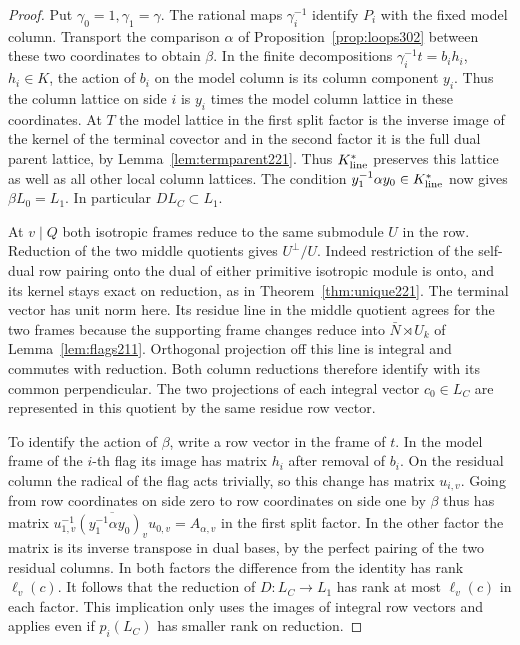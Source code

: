 \documentclass[a4paper,11pt]{article}
\theoremstyle{definition}
\theoremstyle{remark}
\numberwithin{equation}{section}
\begin{document}
\begin{proof}
Put \(\gamma_0=1,\gamma_1=\gamma\). The rational maps
\(\gamma_i^{-1}\) identify \(P_i\) with the fixed model
column. Transport the comparison \(\alpha\) of
Proposition~\ref{prop:loops302} between these two coordinates
to obtain \(\beta\). In the finite decompositions
\(\gamma_i^{-1}t=b_i h_i\), \(h_i\in K\), the action of
\(b_i\) on the model column is its column component \(y_i\).
Thus the column lattice on side \(i\) is \(y_i\) times the
model column lattice in these coordinates. At \(T\) the
model lattice in the first split factor is the inverse
image of the kernel of the terminal covector and in the
second factor it is the full dual parent lattice, by
Lemma~\ref{lem:termparent221}. Thus \(K_{\rm line}^*\)
preserves this lattice as well as all other local column
lattices. The condition \(y_1^{-1}\alpha y_0\in K_{\rm line}^*\)
now gives \(\beta L_0=L_1\). In particular \(D L_C\subset L_1\).

At \(v\mid Q\) both isotropic frames reduce to the same
submodule \(U\) in the row. Reduction of the two middle
quotients gives \(U^\perp/U\). Indeed restriction of the
self-dual row pairing onto the dual of either primitive
isotropic module is onto, and its kernel stays exact on
reduction, as in Theorem~\ref{thm:unique221}. The terminal
vector has unit norm here. Its residue line in the middle
quotient agrees for the two frames because the supporting
frame changes reduce into \(\bar N\rtimes U_k\) of
Lemma~\ref{lem:flags211}. Orthogonal projection off this
line is integral and commutes with reduction. Both column
reductions therefore identify with its common perpendicular.
The two projections of each integral vector \(c_0\in L_C\)
are represented in this quotient by the same residue
row vector.

To identify the action of \(\beta\), write a row vector in
the frame of \(t\). In the model frame of the \(i\)-th flag its
image has matrix \(h_i\) after removal of \(b_i\). On the
residual column the radical of the flag acts trivially, so
this change has matrix \(u_{i,v}\). Going from row coordinates
on side zero to row coordinates on side one by \(\beta\)
thus has matrix
\(u_{1,v}^{-1}\overline{(y_1^{-1}\alpha y_0)_v}u_{0,v}
=A_{\alpha,v}\) in the first split factor. In the other
factor the matrix is its inverse transpose in dual bases,
by the perfect pairing of the two residual columns. In both
factors the difference from the identity has rank \(\ell_v(c)\).
It follows that the reduction of \(D:L_C\to L_1\) has rank
at most \(\ell_v(c)\) in each factor. This implication
only uses the images of integral row vectors and applies
even if \(p_i(L_C)\) has smaller rank on reduction.


\end{proof}
\end{document}
